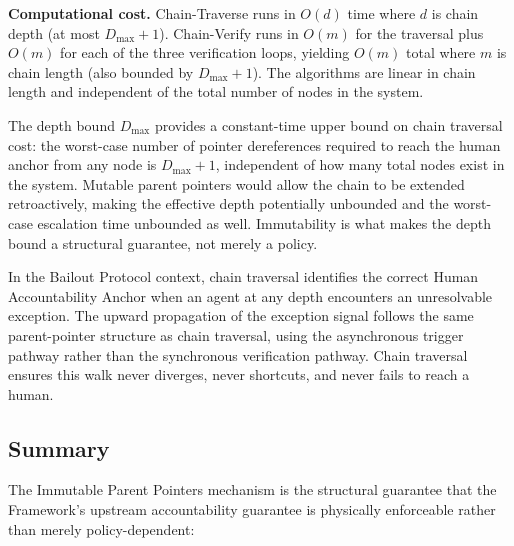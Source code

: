 \bigskip
\noindent\textbf{Computational cost.} Chain-Traverse runs in $O(d)$ time where $d$ is chain depth (at most $D_{\max} + 1$). Chain-Verify runs in $O(m)$ for the traversal plus $O(m)$ for each of the three verification loops, yielding $O(m)$ total where $m$ is chain length (also bounded by $D_{\max} + 1$). The algorithms are linear in chain length and independent of the total number of nodes in the system.

The depth bound $D_{\max}$ provides a constant-time upper bound on chain traversal cost: the worst-case number of pointer dereferences required to reach the human anchor from any node is $D_{\max} + 1$, independent of how many total nodes exist in the system. Mutable parent pointers would allow the chain to be extended retroactively, making the effective depth potentially unbounded and the worst-case escalation time unbounded as well. Immutability is what makes the depth bound a structural guarantee, not merely a policy.

In the Bailout Protocol context, chain traversal identifies the correct Human Accountability Anchor when an agent at any depth encounters an unresolvable exception. The upward propagation of the exception signal follows the same parent-pointer structure as chain traversal, using the asynchronous trigger pathway rather than the synchronous verification pathway. Chain traversal ensures this walk never diverges, never shortcuts, and never fails to reach a human.

\subsection{Summary}
\label{sec:ipp-summary}

The Immutable Parent Pointers mechanism is the structural guarantee that the \bxthree{} Framework's upstream accountability guarantee is physically enforceable rather than merely policy-dependent:

